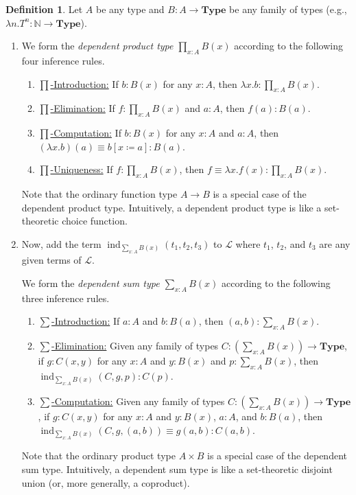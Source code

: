 \documentclass[10pt,letterpaper,cm]{nupset}
\theoremstyle{definition}
\newtheorem{definition}{Definition}[subsection]
\theoremstyle{theorem}
\theoremstyle{remark}
\newcommand{\N}{\mathbb N}
\newcommand{\1}{\mathbf{1}}
\newcommand{\0}{\vec 0}
\DeclareMathOperator{\ind}{ind}
\begin{document}
\begin{definition} Let $A$ be any type and $B : A \to \mathbf{Type}$ be any family of types (e.g., $\lambda n.T^n : \N \to \mathbf{Type}$).  
\begin{enumerate}
\item We form the \textit{dependent product type $\prod_{x:A} B(x)$} according to the following four inference rules.
\begin{enumerate}
\item \underline{${\prod}$-Introduction:} If $ b: B(x)$ for any $x: A$, then $\lambda x. b : \prod_{x : A} B(x)$.
\item \underline{${\prod}$-Elimination:} If $f:  \prod_{x : A} B(x)$ and $a: A$, then $f(a) : B(a)$.
\item \underline{${\prod}$-Computation:} If $ b: B(x)$ for any $x : A$ and $a: A$, then $\left(\lambda x.b\right)(a) \equiv b[x\coloneqq a]: B(a)$.
\item \underline{${\prod}$-Uniqueness:} If $f: \prod_{x:A} B(x)$, then $f \equiv \lambda x. f(x) : \prod_{x:A} B(x)$.
\end{enumerate}
Note that the ordinary function type $A \to B$ is a special case of the dependent product type. Intuitively, a dependent product type is like a set-theoretic choice function. 
\item Now, add the term $\ind_{\sum_{x:A}B(x)}(t_1, t_2, t_3)$ to $\mathcal{L}$ where $t_1$, $t_2$, and $t_3$ are any given terms of $\mathcal{L}$. 

We form the \textit{dependent sum type $\sum_{x:A} B(x)$} according to the following three inference rules.
\begin{enumerate}
\item \underline{${\sum}$-Introduction:} If $a: A$ and $b: B(a)$, then $\left(a, b\right) : \sum_{x: A} B(x)$.
\item \underline{${\sum}$-Elimination:} Given any family of types $C: \left(\sum_{x:A} B(x)\right) \to \mathbf{Type}$, if $g: C(x,y)$ for any $x: A$ and $y: B(x)$ and $p: \sum_{x:A}B(x)$, then $\ind_{\sum_{x:A}B(x)}(C, g, p) : C(p)$.
\item \underline{${\sum}$-Computation:}  Given any family of types $C: \left(\sum_{x:A} B(x)\right) \to \mathbf{Type}$, if $g: C(x,y)$ for any $x: A$ and $y: B(x)$, $a: A$, and $b: B(a)$, then $\ind_{\sum_{x:A}B(x)}(C, g, (a,b)) \equiv g(a,b) : C(a,b)$.
\end{enumerate}
Note that the ordinary product type $A  \times B$ is a special case of the dependent sum type. Intuitively, a dependent sum type is like a set-theoretic disjoint union (or, more generally, a coproduct).
\end{enumerate}
\end{definition}
\end{document}
